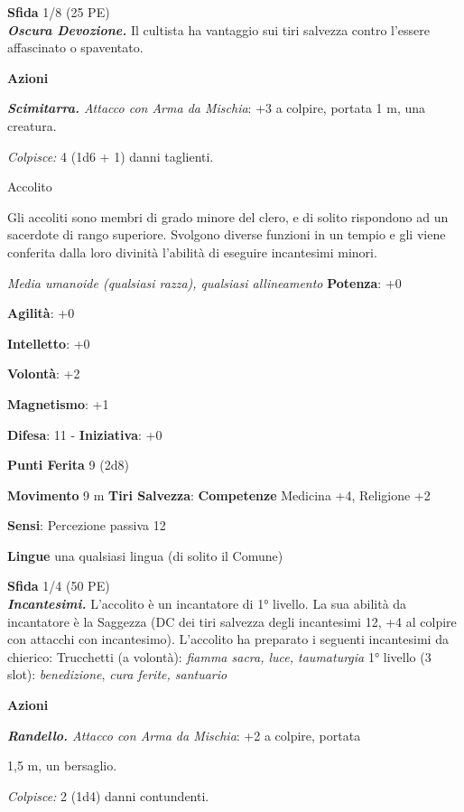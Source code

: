 \begin{multicols}{2}
\textbf{Sfida} 1/8 (25 PE)\smallskip\\

\emph{\textbf{Oscura Devozione.}} Il cultista ha vantaggio sui tiri
salvezza contro l'essere affascinato o spaventato.

\smallskip\textbf{Azioni}

\emph{\textbf{Scimitarra.} Attacco con Arma da Mischia}: +3 a colpire,
portata 1 m, una creatura.

\emph{Colpisce:} 4 (1d6 + 1) danni taglienti.

Accolito

Gli accoliti sono membri di grado minore del clero, e di solito
rispondono ad un sacerdote di rango superiore. Svolgono diverse funzioni
in un tempio e gli viene conferita dalla loro divinità l'abilità di
eseguire incantesimi minori.

\emph{Media umanoide (qualsiasi razza), qualsiasi allineamento}
\textbf{Potenza}: +0

\textbf{Agilità}: +0

\textbf{Intelletto}: +0

\textbf{Volontà}: +2

\textbf{Magnetismo}: +1

\textbf{Difesa}: 11 - \textbf{Iniziativa}: +0

\textbf{Punti Ferita} 9 (2d8)

\textbf{Movimento} 9 m
\textbf{Tiri Salvezza}:
\textbf{Competenze} Medicina +4, Religione +2

\textbf{Sensi}: Percezione passiva 12

\textbf{Lingue} una qualsiasi lingua (di solito il Comune)

\textbf{Sfida} 1/4 (50 PE)\smallskip\\

\emph{\textbf{Incantesimi.}} L'accolito è un incantatore di 1° livello.
La sua abilità da incantatore è la Saggezza (DC dei tiri salvezza degli
incantesimi 12, +4 al colpire con attacchi con incantesimo). L'accolito
ha preparato i seguenti incantesimi da chierico: Trucchetti (a volontà):
\emph{fiamma sacra, luce, taumaturgia} 1° livello (3 slot):
\emph{benedizione}, \emph{cura ferite, santuario}

\smallskip\textbf{Azioni}


\emph{\textbf{Randello.} Attacco con Arma da Mischia}: +2 a colpire,
portata

1,5 m, un bersaglio.

\emph{Colpisce:} 2 (1d4) danni contundenti.



\end{multicols}
